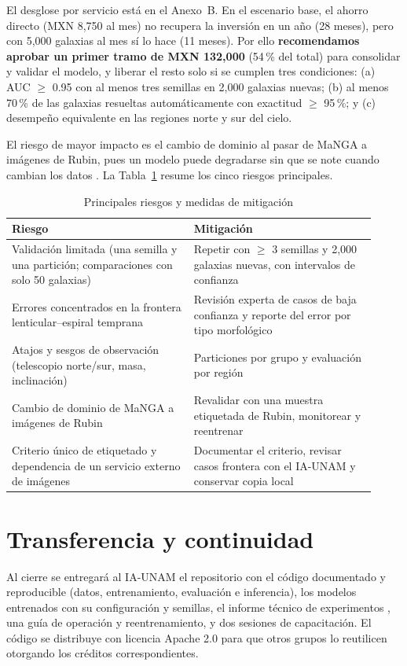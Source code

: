 \documentclass[letterpaper,11pt]{article}
\begin{document}
\noindent El desglose por servicio está en el Anexo~B. En el escenario base, el ahorro directo (MXN 8,750 al mes) no recupera la inversión en un año (28 meses), pero con 5,000 galaxias al mes sí lo hace (11 meses). Por ello \textbf{recomendamos aprobar un primer tramo de MXN 132,000} (54\,\% del total) para consolidar y validar el modelo, y liberar el resto solo si se cumplen tres condiciones: (a) AUC $\geq$ 0.95 con al menos tres semillas en 2,000 galaxias nuevas; (b) al menos 70\,\% de las galaxias resueltas automáticamente con exactitud $\geq$ 95\,\%; y (c) desempeño equivalente en las regiones norte y sur del cielo.

\medskip
\noindent El riesgo de mayor impacto es el cambio de dominio al pasar de MaNGA a imágenes de Rubin, pues un modelo puede degradarse sin que se note cuando cambian los datos \parencite{babic2021}. La Tabla~\ref{tab:rie} resume los cinco riesgos principales.

\begin{table}[!ht]
\centering
\caption{Principales riesgos y medidas de mitigación}\label{tab:rie}
\small
\begin{tabular}{@{}p{0.46\linewidth}@{\hspace{0.06\linewidth}}p{0.46\linewidth}@{}}
\toprule
\textbf{Riesgo} & \textbf{Mitigación}\\
\midrule
Validación limitada (una semilla y una partición; comparaciones con solo 50 galaxias) & Repetir con $\geq$ 3 semillas y 2,000 galaxias nuevas, con intervalos de confianza\\[3pt]
Errores concentrados en la frontera lenticular--espiral temprana & Revisión experta de casos de baja confianza y reporte del error por tipo morfológico\\[3pt]
Atajos y sesgos de observación (telescopio norte/sur, masa, inclinación) & Particiones por grupo y evaluación por región\\[3pt]
Cambio de dominio de MaNGA a imágenes de Rubin & Revalidar con una muestra etiquetada de Rubin, monitorear y reentrenar\\[3pt]
Criterio único de etiquetado y dependencia de un servicio externo de imágenes & Documentar el criterio, revisar casos frontera con el IA-UNAM y conservar copia local\\
\bottomrule
\end{tabular}
\end{table}

\section*{Transferencia y continuidad}
Al cierre se entregará al IA-UNAM el repositorio con el código documentado y reproducible (datos, entrenamiento, evaluación e inferencia), los modelos entrenados con su configuración y semillas, el informe técnico de experimentos \parencite{carreno2026}, una guía de operación y reentrenamiento, y dos sesiones de capacitación. El código se distribuye con licencia Apache 2.0 para que otros grupos lo reutilicen otorgando los créditos correspondientes.
\end{document}
